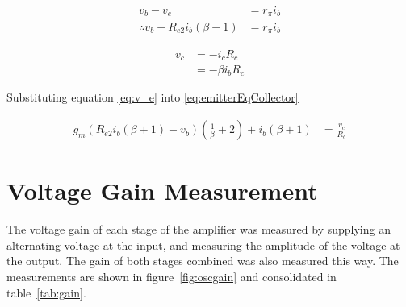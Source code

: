 \documentclass[a4paper,11pt]{article}
\begin{document}
\begin{subequations}
\begin{align}
v_b - v_e &= r_\pi i_b\\
\therefore v_b - R_{e2} i_b (\beta + 1) &= r_\pi i_b
\end{align}
\end{subequations}

\begin{subequations}
\begin{align}
v_c &= -i_c R_c\\
&= -\beta i_b R_c \label{eq:v_c}
\end{align}
\end{subequations}

Substituting equation \ref{eq:v_e} into \ref{eq:emitterEqCollector}

\begin{subequations}
\begin{align}
g_m \left(R_{e2} i_b (\beta + 1) - v_b\right) \left( \frac{1}{\beta} + 2 \right) + i_b (\beta + 1) &= \frac{v_c}{R_c}
\end{align}
\end{subequations}

\newpage
\section{Voltage Gain Measurement}
    The voltage gain of each stage of the amplifier was measured by supplying an alternating voltage at the input, and measuring the amplitude of the voltage at the output. The gain of both stages combined was also measured this way. The measurements are shown in figure~\ref{fig:oscgain} and consolidated in table~\ref{tab:gain}.
    
\end{document}

